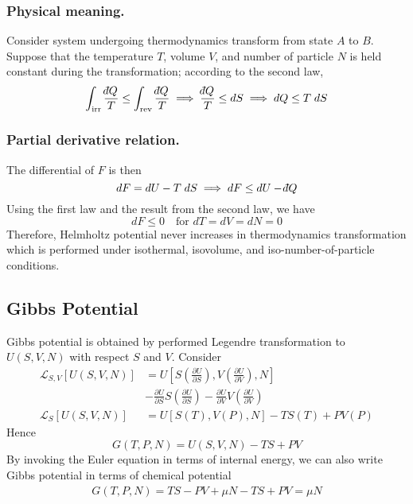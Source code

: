 \documentclass[../../../Main.tex]{subfiles}
\begin{document}
\subsubsection{Physical meaning.} Consider system undergoing thermodynamics transform from state $A$ to $B$. Suppose that the temperature $T$, volume $V$, and number of particle $N$ is held constant during the transformation; according to the second law,
\begin{equation*}
    \int_\text{irr}\frac{\dbar Q}{T}\leq\int_\text{rev}\frac{\dbar Q}{T} \implies \frac{\dbar Q}{T}\leq d S\implies d Q\leq T\;d S
\end{equation*}
\subsubsection{Partial derivative relation.} The differential of $F$ is then 
\begin{equation*}
    dF=dU-T\;dS\implies dF\leq dU-\dbar Q
\end{equation*}
Using the first law and the result from the second law, we have
\begin{equation*}
    dF\leq0\quad\text{for }dT=dV=dN=0
\end{equation*} 
Therefore, Helmholtz potential never increases in thermodynamics transformation which is performed under isothermal, isovolume, and iso-number-of-particle conditions.

\subsection{Gibbs Potential}
Gibbs potential is obtained by performed Legendre transformation to $U(S,V,N)$ with respect $S$ and $V$. Consider
\begin{align*}
    \mathcal{L}_{S,V}[U(S,V,N)]&=U\left[S\left(\frac{\partial U}{\partial S}\right), V\left(\frac{\partial U}{\partial V}\right),N\right]\\
    &-\frac{\partial U}{\partial S}S\left(\frac{\partial U}{\partial S}\right) - \frac{\partial U}{\partial V}V\left(\frac{\partial U}{\partial V}\right)\\
    \mathcal{L}_S[U(S,V,N)]&=U[S(T),V(P),N]-TS(T)+PV(P)
\end{align*}
Hence
\begin{equation*}
    G(T,P,N)=U(S,V,N)-TS+PV
\end{equation*}
By invoking the Euler equation in terms of internal energy, we can also write Gibbs potential in terms of chemical potential 
\begin{align*}
    G(T,P,N)=TS-PV+\mu N-TS+PV=\mu N
\end{align*}
\end{document}
